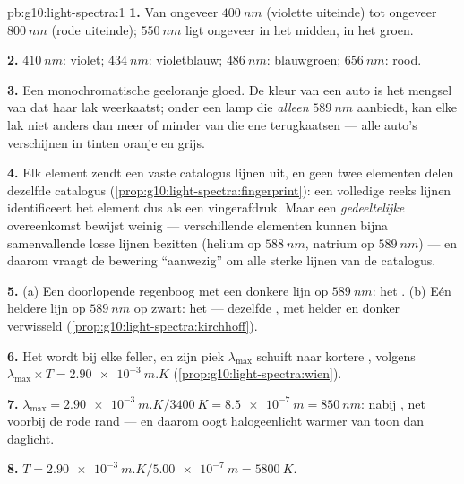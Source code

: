 \begin{solution}{pb:g10:light-spectra:1}
\textbf{1.} Van ongeveer $\qty{400}{nm}$ (violette uiteinde) tot ongeveer
$\qty{800}{nm}$ (rode uiteinde); $\qty{550}{nm}$ ligt ongeveer in het
midden, in het groen.

\textbf{2.} $\qty{410}{nm}$: violet; $\qty{434}{nm}$: violetblauw;
$\qty{486}{nm}$: blauwgroen; $\qty{656}{nm}$: rood.

\textbf{3.} Een monochromatische geeloranje gloed. De kleur van een auto
is het mengsel van  dat haar lak weerkaatst; onder een lamp
die \emph{alleen} $\qty{589}{nm}$ aanbiedt, kan elke lak niet anders dan
meer of minder van die ene  terugkaatsen --- alle auto's
verschijnen in tinten oranje en grijs.

\textbf{4.} Elk element zendt een vaste catalogus lijnen uit, en geen
twee elementen delen dezelfde catalogus
(\cref{prop:g10:light-spectra:fingerprint}): een volledige reeks lijnen
identificeert het element dus als een vingerafdruk. Maar een
\emph{gedeeltelijke} overeenkomst bewijst weinig --- verschillende
elementen kunnen bijna samenvallende losse lijnen bezitten (helium op
$\qty{588}{nm}$, natrium op $\qty{589}{nm}$) --- en daarom vraagt de
bewering ``aanwezig'' om alle sterke lijnen van de catalogus.

\textbf{5.} (a) Een doorlopende regenboog met een donkere lijn op
$\qty{589}{nm}$: het . (b) Eén heldere lijn op
$\qty{589}{nm}$ op zwart: het  --- dezelfde ,
met helder en donker verwisseld
(\cref{prop:g10:light-spectra:kirchhoff}).

\textbf{6.} Het  wordt bij elke  feller, en zijn piek
$\lambda_{\max}$ schuift naar kortere , volgens
$\lambda_{\max} \times T = \qty{2.90e-3}{m.K}$
(\cref{prop:g10:light-spectra:wien}).

\textbf{7.} $\lambda_{\max} = \qty{2.90e-3}{m.K} / \qty{3400}{K}
= \qty{8.5e-7}{m} = \qty{850}{nm}$: nabij , net voorbij de rode
rand --- en daarom oogt halogeenlicht warmer van toon dan daglicht.

\textbf{8.} $T = \qty{2.90e-3}{m.K} / \qty{5.00e-7}{m} = \qty{5800}{K}$.


\end{solution}
